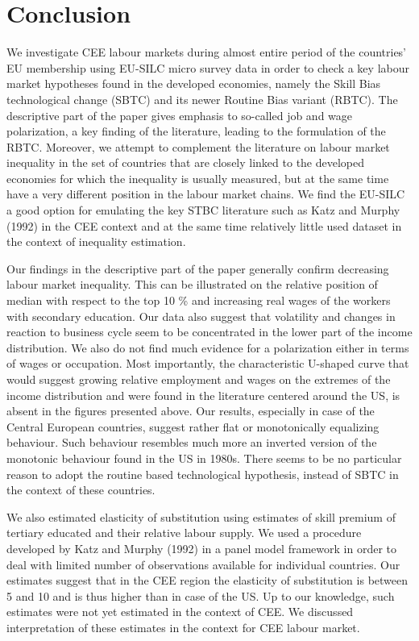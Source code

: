 \documentclass{article}
\begin{document}
\section{Conclusion}
We investigate CEE labour markets during almost entire period of the countries' EU membership using EU-SILC micro survey data in order to check a key labour market hypotheses found in the developed economies, namely the Skill Bias technological change (SBTC) and its newer Routine Bias variant (RBTC). The descriptive part of the paper gives emphasis to so-called job and wage polarization, a key finding of the literature, leading to the formulation of the RBTC.
Moreover, we attempt to complement the literature on labour market inequality in the set of countries that are closely linked to the developed economies for which the inequality is usually measured, but at the same time have a very different position in the labour market chains. We find the EU-SILC a good option for emulating the key STBC literature such as Katz and Murphy (1992) in the CEE context and at the same time relatively little used dataset in the context of inequality estimation.

Our findings in the descriptive part of the paper generally confirm decreasing labour market inequality. This can be illustrated on the relative position of median with respect to the top 10 \% and increasing real wages of the workers with secondary education. Our data also suggest that volatility and changes in reaction to business cycle seem to be concentrated in the lower part of the income distribution.
We also do not find much evidence for a polarization either in terms of wages or occupation. Most importantly, the characteristic U-shaped curve that would suggest growing relative employment and wages on the extremes of the income distribution and were found in the literature centered around the US, is absent in the figures presented above. Our results, especially in case of the Central European countries, suggest rather flat or monotonically equalizing behaviour. Such behaviour resembles much more an inverted version of the monotonic behaviour found in the US in 1980s. There seems to be no particular reason to adopt the routine based technological hypothesis, instead of SBTC in the context of these countries. 

We also estimated elasticity of substitution using estimates of skill premium of tertiary educated and their relative labour supply. We used a procedure developed by Katz and Murphy (1992) in a panel model framework in order to deal with limited number of observations available for individual countries. Our estimates suggest that in the CEE region the elasticity of substitution is between 5 and 10 and is thus higher than in case of the US. Up to our knowledge, such estimates were not yet estimated in the context of CEE. We discussed interpretation of these estimates in the context for CEE labour market.
\end{document}
